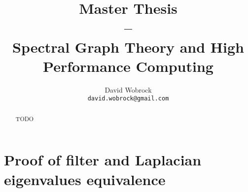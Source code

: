 \documentclass[]{report}
\title{Master Thesis \\ -- \\ Spectral Graph Theory and High Performance Computing}
\author{David Wobrock\\\texttt{david.wobrock@gmail.com}}
\begin{document}
\begin{titlepage}
 \maketitle
\end{titlepage}

\begin{abstract}
 TODO
\end{abstract}

\tableofcontents
\newpage







\clearpage
\printbibliography

\appendix
\chapter{Proof of filter and Laplacian eigenvalues equivalence}
\label{appendix:eigenvalue_proof}

\end{document}
